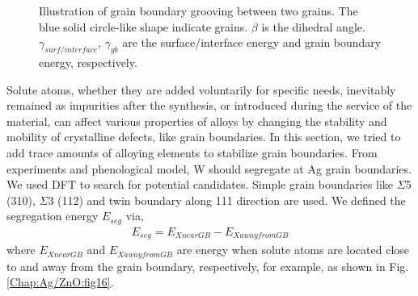 \begingroup
\begin{figure}[!ht]
  \centering
  \caption[Illustration of grain boundary grooving effects.]{Illustration of grain boundary grooving between two grains. The blue solid circle-like shape indicate grains. $\beta$ is the dihedral angle. $\gamma_{surf/interface}$, $\gamma_{gb}$ are the surface/interface energy and grain boundary energy, respectively.}
  \label{Chap:Ag/ZnO:fig15}
\end{figure}
\endgroup


Solute atoms, whether they are added voluntarily for specific needs, inevitably remained as impurities after the synthesis, or introduced during the service of the material, can affect various properties of alloys by changing the stability and mobility of crystalline defects, like grain boundaries. In this section, we tried to add trace amounts of alloying elements to stabilize grain boundaries. From experiments and phenological model, W should segregate at Ag grain boundaries. \cite{chookajorn2012design,jiao2018nanocrystalline} We used \ac{DFT} to search for potential candidates. Simple grain boundaries like $\Sigma$5 (310), $\Sigma$3 (112) and twin boundary along {111} direction are used. We defined the segregation energy $E_{seg}$ via,
\begin{align}
E_{seg} = E_{X near GB} - E_{X away from GB}
 \label{Chap:Ag/ZnO:eq:gb_seg}
\end{align}
where $E_{X near GB}$ and $E_{X away from GB}$ are energy when solute atoms are located close to and away from the grain boundary, respectively, for example, as shown in Fig. \ref{Chap:Ag/ZnO:fig16}.


